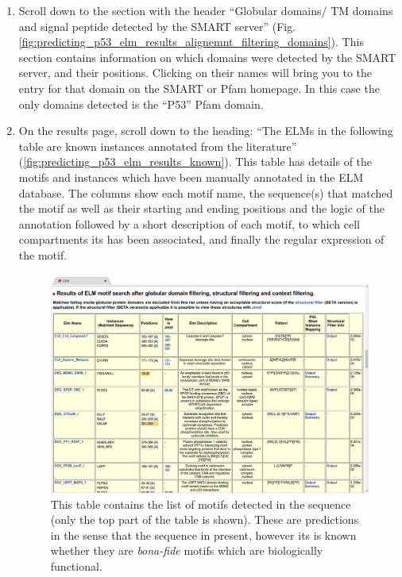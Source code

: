 \begin{enumerate}
\item Scroll down to the section with the header ``Globular domains/ TM domains
	and signal peptide detected by the SMART server''
	(Fig. \ref{fig:predicting_p53_elm_results_alignemnt_filtering_domains}).
	This section contains information on which domains were detected by the
	SMART server, and their positions. Clicking on their names will bring
	you to the entry for that domain on the SMART or Pfam homepage.
	In this case the only domains detected is the ``P53'' Pfam domain.

\item On the results page, scroll down to the heading: ``The ELMs in the
	following table are known instances annotated from the literature''
	(\ref{fig:predicting_p53_elm_results_known}).
	This table has details of the motifs and instances which have been
	manually annotated in the ELM database. The columns show each motif
	name, the sequence(s) that matched the motif as well as their starting
	and ending positions and the logic of the annotation followed by a
	short description of each motif, to which cell compartments its has
	been associated, and finally the regular expression of the motif.

\begin{figure}[h!]
	\centering
	\includegraphics[width=\textwidth]{Figures/predicting_p53/elm_results_motifs.png}
	\caption{
	This table contains the list of motifs detected in the sequence (only
	the top part of the table is shown). These are predictions in the sense
	that the sequence in present, however its is known whether they are
	\emph{bona-fide} motifs which are biologically functional.
	}
	\label{fig:predicting_p53_elm_results_motifs}
\end{figure}


\end{enumerate}
